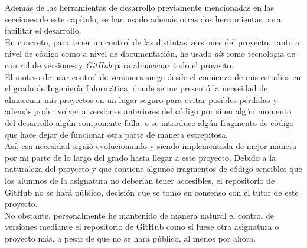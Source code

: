 Además de las herramientas de desarrollo previamente mencionadas en las secciones de este capítulo, se han usado además otras dos herramientas para facilitar el desarrollo.\\

En concreto, para tener un control de las distintas versiones del proyecto, tanto a nivel de código como a nivel de documentación, he usado \textit{git} como tecnología de control de versiones y \textit{GitHub} para almacenar todo el proyecto.\\

El motivo de usar control de versiones surge desde el comienzo de mis estudios en el grado de Ingeniería Informática, donde se me presentó la necesidad de almacenar mis proyectos en un lugar seguro para evitar posibles pérdidas y además poder volver a versiones anteriores del código por si en algún momento del desarrollo algún componente falla, o se introduce algún fragmento de código que hace dejar de funcionar otra parte de manera estrepitosa.\\

Así, esa necesidad siguió evolucionando y siendo implementada de mejor manera por mi parte de lo largo del grado hasta llegar a este proyecto. Debido a la naturaleza del proyecto y que contiene algunos fragmentos de código sensibles que los alumnos de la asignatura no deberían tener accesibles, el repositorio de GitHub no se hará público, decisión que se tomó en consenso con el tutor de este proyecto.\\

No obstante, personalmente he mantenido de manera natural el control de versiones mediante el repositorio de GitHub como si fuese otra asignatura o proyecto más, a pesar de que no se hará público, al menos por ahora.